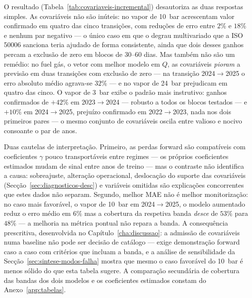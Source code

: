 O resultado (Tabela~\ref{tab:covariaveis-incremental}) desautoriza as duas respostas
simples. As covariáveis não são inúteis: no vapor de 10~bar acrescentam valor
confirmado em quatro das cinco transições, com reduções de erro entre $2\%$ e
$18\%$ e nenhum par negativo --- o único caso em que o degrau multivariado
que a ISO 50006 sanciona teria ajudado de forma consistente, ainda que dois
desses ganhos percam a exclusão de zero em blocos de 30--60 dias. Mas também
não são um remédio: no fuel gás, o vetor com melhor modelo em $Q$, as
covariáveis \emph{pioram} a previsão em duas transições com exclusão de zero
--- na transição 2024${\to}$2025 o erro absoluto médio agrava-se $32\%$ --- e
no vapor de 24~bar prejudicam em quatro das cinco. O vapor de 3~bar exibe o
padrão mais instrutivo: ganhos confirmados de $+42\%$ em 2023${\to}$2024 ---
robusto a todos os blocos testados --- e $+10\%$ em 2024${\to}$2025, prejuízo
confirmado em 2022${\to}$2023, nada nos dois primeiros pares --- o mesmo
conjunto de covariáveis oscila entre valioso e nocivo consoante o par de
anos.

Duas cautelas de interpretação. Primeiro, as perdas forward são compatíveis
com coeficientes $\gamma$ pouco transportáveis entre regimes --- os próprios
coeficientes estimados mudam de sinal entre anos de treino --- mas o contraste
não identifica a causa: sobreajuste, alteração operacional, deslocação do
suporte das covariáveis (Secção~\ref{sec:diagnosticos-desc}) e variáveis
omitidas são explicações concorrentes que estes dados não separam. Segundo,
melhor MAE não é melhor monitorização: no caso mais favorável, o vapor de
10~bar em 2024${\to}$2025, o modelo aumentado reduz o erro médio em $6\%$ mas
a cobertura da respetiva banda \emph{desce} de $53\%$ para $48\%$ --- a
melhoria na métrica pontual não repara a banda. A consequência prescritiva,
desenvolvida no Capítulo~\ref{cha:discussao}: a admissão de covariáveis numa
baseline não pode ser decisão de catálogo --- exige demonstração forward caso
a caso com critérios que incluam a banda, e a análise de sensibilidade da
Secção~\ref{sec:sintese-modos-falha} mostra que mesmo o caso favorável do
10~bar é menos sólido do que esta tabela sugere. A comparação secundária de
cobertura das bandas dos dois modelos e os coeficientes estimados constam do
Anexo~\ref{app:tabelas}.


